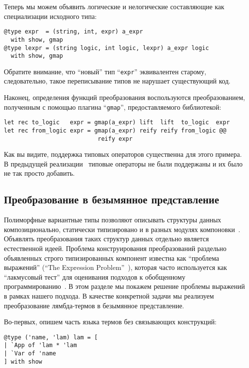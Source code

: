 Теперь мы можем объявить логические и нелогические составляющие как специализации исходного типа:

\begin{lstlisting}
@type expr  = (string, int, expr) a_expr 
  with show, gmap
@type lexpr = (string logic, int logic, lexpr) a_expr logic 
  with show, gmap
\end{lstlisting}

Обратите внимание, что ``новый'' тип ``\lstinline{expr}'' эквивалентен старому, следовательно, такое переписывание типов не нарушает существующий код.

Наконец, определения функций преобразования воспользуются преобразованием, полученным с помощью плагина ``\lstinline{gmap}'', предоставляемого библиотекой:

\begin{lstlisting}
let rec to_logic   expr = gmap(a_expr) lift  lift  to_logic  expr
let rec from_logic expr = gmap(a_expr) reify reify from_logic @@ 
                           reify expr
\end{lstlisting}

Как вы видите, поддержка типовых операторов существенна для этого примера. В предыдущей реализации~\cite{TransformationObjects} типовые операторы не были поддержаны и их было не так просто добавить.

\subsection{Преобразование в безымянное представление}

Полиморфные вариантные типы позволяют описывать структуры данных композиционально, статически типизировано и в разных модулях 
компоновки~\cite{PolyVarReuse}.
Объявлять преобразования таких структур данных отдельно является естественной идеей. Проблема конструирования преобразований 
раздельно объявленных строго типизированных компонент известна как ``проблема выражений'' (``The Expression Problem''~\cite{ExpressionProblem}), которая часто используется как ``лакмусовый тест'' для оценивания подходов к обобщенному программированию~\cite{ObjectAlgebras,ALaCarte}. 
В этом разделе мы покажем решение проблемы выражений в рамках нашего подхода. В качестве конкретной задачи мы реализуем преобразование лямбда-термов в безымянное представление.

Во-первых, опишем часть языка термов без связывающих конструкций:

\begin{lstlisting}
@type ('name, 'lam) lam = [
| `App of 'lam * 'lam
| `Var of 'name
] with show
\end{lstlisting}

